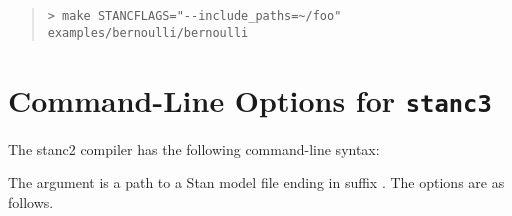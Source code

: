 %
\begin{quote}
\begin{Verbatim}[fontshape=sl]
> make STANCFLAGS="--include_paths=~/foo" examples/bernoulli/bernoulli
\end{Verbatim}
\end{quote}
%


\section{Command-Line Options for {\tt\bfseries stanc3}}

The stanc2 compiler has the following command-line syntax:
%
\begin{quote}
\end{quote}
%
The argument  is a path to a Stan model
file ending in suffix .  The options are as follows.
%
